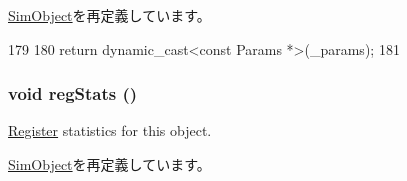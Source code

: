 \hyperlink{classSimObject_acd3c3feb78ae7a8f88fe0f110a718dff}{SimObject}を再定義しています。


\begin{DoxyCode}
179     {
180         return dynamic_cast<const Params *>(_params);
181     }
\end{DoxyCode}
\hypertarget{classBasePrefetcher_a4dc637449366fcdfc4e764cdf12d9b11}{
\subsubsection[{regStats}]{\setlength{\rightskip}{0pt plus 5cm}void regStats ()}}
\label{classBasePrefetcher_a4dc637449366fcdfc4e764cdf12d9b11}
\hyperlink{classRegister}{Register} statistics for this object. 

\hyperlink{classSimObject_a4dc637449366fcdfc4e764cdf12d9b11}{SimObject}を再定義しています。


